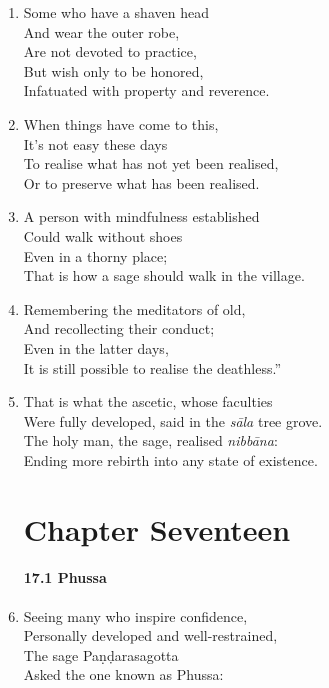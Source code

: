 \documentclass[10pt, openany]{book}
\begin{document}
\begin{enumerate}
\item Some who have a shaven head \\
And wear the outer robe,\\
Are not devoted to practice,\\
But wish only to be honored,\\
Infatuated with property and reverence.

\item When things have come to this,\\
It’s not easy these days\\
To realise what has not yet been realised,\\
Or to preserve what has been realised.

\item A person with mindfulness established\\
Could walk without shoes\\
Even in a thorny place;\\
That is how a sage should walk in the village.

\item Remembering the meditators of old,\\
And recollecting their conduct;\\
Even in the latter days,\\
It is still possible to realise the deathless.”

\item That is what the ascetic, whose faculties\\
Were fully developed, said in the \emph{sāla} tree grove.\\
The holy man, the sage, realised \emph{nibbāna}:\\
Ending more rebirth into any state of existence.

\chapter*{Chapter Seventeen}

\subsubsection*{17.1 Phussa}

\item Seeing many who inspire confidence,\\
Personally developed and well-restrained,\\
The sage Paṇḍarasagotta\\
Asked the one known as Phussa:


\end{enumerate}
\end{document}
